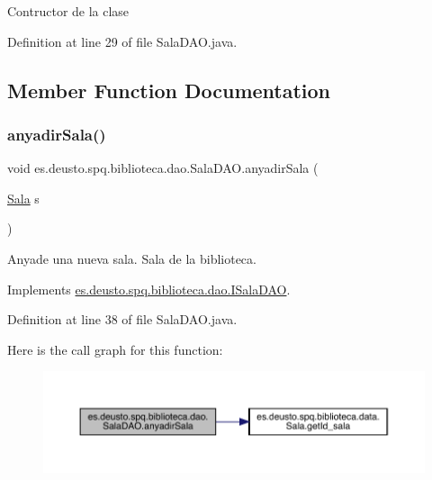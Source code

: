 Contructor de la clase 

Definition at line 29 of file Sala\+D\+A\+O.\+java.



\subsection{Member Function Documentation}
\mbox{\label{classes_1_1deusto_1_1spq_1_1biblioteca_1_1dao_1_1_sala_d_a_o_ab057300f33df6ae974e6e949900b1dc7}} 
\subsubsection{\texorpdfstring{anyadir\+Sala()}{anyadirSala()}}
{\footnotesize\ttfamily void es.\+deusto.\+spq.\+biblioteca.\+dao.\+Sala\+D\+A\+O.\+anyadir\+Sala (\begin{DoxyParamCaption}\item[{\mbox{\hyperlink{classes_1_1deusto_1_1spq_1_1biblioteca_1_1data_1_1_sala}{Sala}}}]{s }\end{DoxyParamCaption})}

Anyade una nueva sala.  Sala de la biblioteca. 

Implements \mbox{\hyperlink{interfacees_1_1deusto_1_1spq_1_1biblioteca_1_1dao_1_1_i_sala_d_a_o_a20257b6e5501dd812441aa6795fcd24a}{es.\+deusto.\+spq.\+biblioteca.\+dao.\+I\+Sala\+D\+AO}}.



Definition at line 38 of file Sala\+D\+A\+O.\+java.

Here is the call graph for this function\+:
\nopagebreak
\begin{figure}[H]
\begin{center}
\leavevmode
\includegraphics[width=350pt]{classes_1_1deusto_1_1spq_1_1biblioteca_1_1dao_1_1_sala_d_a_o_ab057300f33df6ae974e6e949900b1dc7_cgraph}
\end{center}
\end{figure}
\mbox{\label{classes_1_1deusto_1_1spq_1_1biblioteca_1_1dao_1_1_sala_d_a_o_a3095e0681af1d32bd5706ca6941e0784}} 
